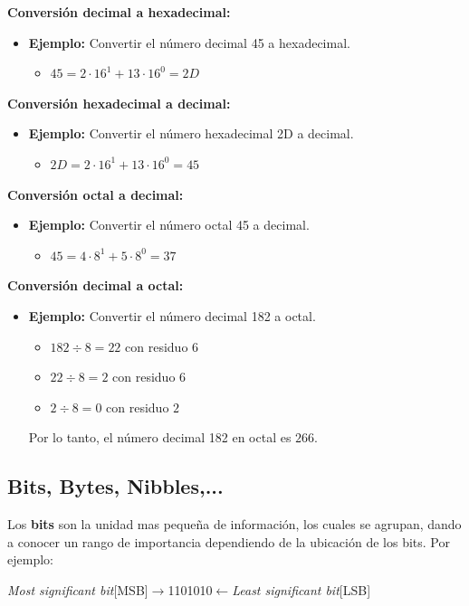 \documentclass{templateNote}
\begin{document}
\textbf{Conversión decimal a hexadecimal:}
\begin{itemize}
    \item \textbf{Ejemplo:} Convertir el número decimal 45 a hexadecimal.
    \begin{itemize}
        \item $45 = 2 \cdot 16^1 + 13 \cdot 16^0 = 2D$
    \end{itemize}
\end{itemize}
\textbf{Conversión hexadecimal a decimal:}
\begin{itemize}
    \item \textbf{Ejemplo:} Convertir el número hexadecimal 2D a decimal.
    \begin{itemize}
        \item $2D = 2 \cdot 16^1 + 13 \cdot 16^0 = 45$
    \end{itemize}
\end{itemize}
\textbf{Conversión octal a decimal:}
\begin{itemize}
    \item \textbf{Ejemplo:} Convertir el número octal 45 a decimal.
    \begin{itemize}
        \item $45 = 4 \cdot 8^1 + 5 \cdot 8^0 = 37$
    \end{itemize}
\end{itemize}
\textbf{Conversión decimal a octal:}
\begin{itemize}
    \item \textbf{Ejemplo:} Convertir el número decimal 182 a octal.
        \begin{itemize}
            \item $182 \div 8 = 22$ con residuo $6$
            \item $22 \div 8 = 2$ con residuo $6$
            \item $2 \div 8 = 0$ con residuo $2$
        \end{itemize}
    Por lo tanto, el número decimal 182 en octal es $266$.
\end{itemize}

\subsection{Bits, Bytes, Nibbles,...}
\noindent Los \textbf{bits} son la unidad mas pequeña de información, los cuales se agrupan, dando a conocer un rango de importancia dependiendo de la ubicación de los bits. Por ejemplo:
\begin{center}
    \textit{Most significant bit}[MSB]$\rightarrow$\colorbox{blue!30}{1}10101\colorbox{blue!30}{0}$\leftarrow$\textit{Least significant bit}[LSB]
\end{center}
\end{document}
